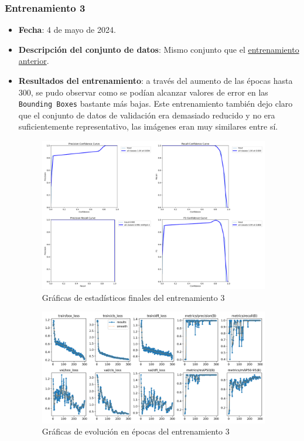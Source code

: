 \subsubsection*{Entrenamiento 3}
\label{train:3}
\begin{itemize}
    \item \textbf{Fecha}: 4 de mayo de 2024.
    \item \textbf{Descripción del conjunto de datos}: Mismo conjunto que el \hyperref[train:2]{entrenamiento anterior}.
    \item \textbf{Resultados del entrenamiento}: a través del aumento de las épocas hasta 300, se pudo observar como se podían alcanzar valores de error en las \texttt{Bounding Boxes} bastante más bajas. 
    Este entrenamiento también dejo claro que el conjunto de datos de validación era demasiado reducido y no era suficientemente representativo, las imágenes eran muy similares entre sí.

    \begin{figure}[H]
        \centering
        \includegraphics[width=0.95\textwidth]{images/13/b/3/graficas2.png}
        \caption{Gráficas de estadísticos finales del entrenamiento 3}
        \label{fig:Estadisticos3}
    \end{figure}
    \begin{figure}[H]
        \centering
        \includegraphics[width=0.95\textwidth]{images/13/b/3/results.png}
        \caption{Gráficas de evolución en épocas del entrenamiento 3}
        \label{fig:Resultados3}
    \end{figure}
\end{itemize}
\clearpage
